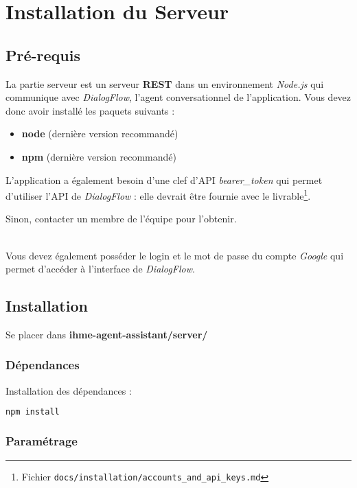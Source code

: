 \chapter{Installation du Serveur}

\section{Pré-requis}
La partie serveur est un serveur \textbf{REST} dans un environnement \emph{Node.js} qui communique avec \emph{DialogFlow}, l'agent conversationnel de l'application. Vous devez donc avoir installé les paquets suivants :
\begin{itemize}
\item \textbf{node} (dernière version recommandé)
\item \textbf{npm} (dernière version recommandé)\\
\end{itemize}


L'application a également besoin d'une clef d'API \og \emph{bearer\_token} \fg{} qui permet d'utiliser l'API de \emph{DialogFlow} : elle devrait être fournie avec le livrable\footnote{Fichier \texttt{docs/installation/accounts\_and\_api\_keys.md}}. 

Sinon, contacter un membre de l'équipe pour l'obtenir.

~\\\indent
Vous devez également posséder le login et le mot de passe du compte \emph{Google} qui permet d'accéder à l'interface de \emph{DialogFlow}.

\section{Installation}

Se placer dans \textbf{ihme-agent-assistant/server/}

\subsection{Dépendances}

Installation des dépendances :
  \begin{lstlisting}[language=bash]
    npm install
  \end{lstlisting}

\subsection{Paramétrage}

